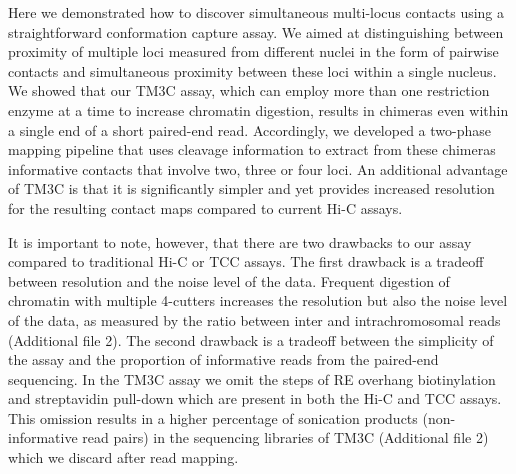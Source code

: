 Here we demonstrated how to discover simultaneous multi-locus contacts using
a straightforward
conformation capture assay. We aimed at distinguishing between proximity
of multiple loci measured from different nuclei in the form of pairwise
contacts and simultaneous proximity between these loci within a single
nucleus. We showed that our TM3C assay, which can employ more than one
restriction enzyme at a time to increase chromatin digestion, results in
chimeras even within a single end of a short paired-end read. Accordingly, we developed
a two-phase  mapping pipeline that uses cleavage information to
extract from these chimeras informative contacts that involve two, three
or four loci. An additional advantage of TM3C is that it is significantly
simpler and yet provides increased resolution for the resulting contact
maps compared to current Hi-C assays.

It is important to note, however, that there are two drawbacks to
our assay compared to traditional Hi-C or TCC assays. The first drawback
is a tradeoff between resolution and the noise level of the data. Frequent
digestion of chromatin with multiple 4-cutters increases the resolution
but also the noise level of the data, as measured by the ratio between
inter and intrachromosomal reads (Additional file 2). The second drawback is
a tradeoff between the simplicity of the assay and the proportion of
informative reads from the paired-end sequencing. In the TM3C assay we omit
the steps of RE overhang biotinylation and streptavidin pull-down which
are present in both the Hi-C and TCC assays. This omission results in a
higher percentage of sonication products (non-informative read pairs)
in the sequencing libraries of TM3C (Additional file 2) which we
discard after read mapping.

